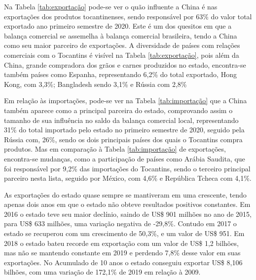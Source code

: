 \par Na Tabela \ref{tab:exportação} pode-se ver o quão influente a China é nas exportações dos produtos tocantinenses, sendo responsável por 63\% do valor total exportado ano primeiro semestre de 2020. Este é um dos quesitos em que a balança comercial se assemelha à balança comercial brasileira, tendo a China como seu maior parceiro de exportações. A diversidade de países com relações comerciais com o Tocantins é visível na Tabela \ref{tab:exportação}, pois além da China, grande compradora dos grãos e carnes produzidos no estado, encontra-se também países como Espanha, representando 6,2\% do total exportado, Hong Kong, com 3,3\%; Bangladesh sendo 3,1\% e Rússia com 2,8\%


\par Em relação às importações, pode-se ver na Tabela \ref{tab:importação} que a China também aparece como a principal parceira do estado, comprovando assim o tamanho de sua influência no saldo da balança comercial local, representando 31\% do total importado pelo estado no primeiro semestre de 2020, seguido pela Rússia com, 26\%, sendo os dois principais países dos quais o Tocantins compra produtos. Mas em comparação à Tabela \ref{tab:importação} de exportações, encontra-se mudanças, como a participação de países como Arábia Saudita, que foi responsável por 9,2\% das importações do Tocantins, sendo o terceiro principal parceiro nesta lista, seguido por México, com 4,6\% e República Tcheca com 4,1\%.



\par As exportações do estado quase sempre se mantiveram em uma crescente, tendo apenas dois anos em que o estado não obteve resultados positivos constantes. Em 2016 o estado teve seu maior declínio, saindo de US\$ 901 milhões no ano de 2015, para US\$ 633 milhões, uma variação negativa de -29,8\%. Contudo em 2017 o estado se recuperou com um crescimento de 50,3\%, e um valor de US\$ 951. Em 2018 o estado bateu recorde em exportação com um valor de US\$ 1,2 bilhões, mas não se mantendo constante em 2019 e perdendo 7,8\% desse valor em suas exportações. No Acumulado de 10 anos o estado conseguiu exportar US\$ 8,106 bilhões, com uma variação de 172,1\% de 2019 em relação à 2009.

